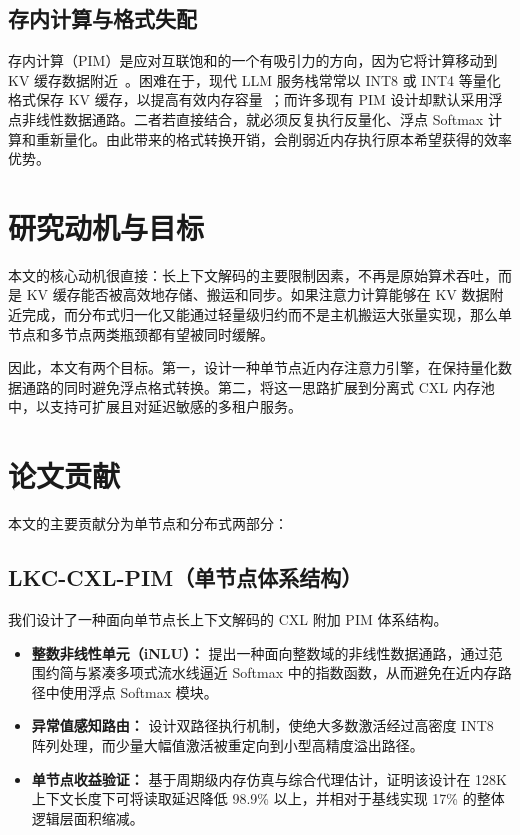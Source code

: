 \subsection{存内计算与格式失配}
存内计算（PIM）是应对互联饱和的一个有吸引力的方向，因为它将计算移动到 KV 缓存数据附近~\cite{samsung_pim}。困难在于，现代 LLM 服务栈常常以 INT8 或 INT4 等量化格式保存 KV 缓存，以提高有效内存容量~\cite{llm_outliers, gptq}；而许多现有 PIM 设计却默认采用浮点非线性数据通路。二者若直接结合，就必须反复执行反量化、浮点 Softmax 计算和重新量化。由此带来的格式转换开销，会削弱近内存执行原本希望获得的效率优势。

\section{研究动机与目标}
本文的核心动机很直接：长上下文解码的主要限制因素，不再是原始算术吞吐，而是 KV 缓存能否被高效地存储、搬运和同步。如果注意力计算能够在 KV 数据附近完成，而分布式归一化又能通过轻量级归约而不是主机搬运大张量实现，那么单节点和多节点两类瓶颈都有望被同时缓解。

因此，本文有两个目标。第一，设计一种单节点近内存注意力引擎，在保持量化数据通路的同时避免浮点格式转换。第二，将这一思路扩展到分离式 CXL 内存池中，以支持可扩展且对延迟敏感的多租户服务。

\section{论文贡献}
本文的主要贡献分为单节点和分布式两部分：

\subsection{LKC-CXL-PIM（单节点体系结构）}
我们设计了一种面向单节点长上下文解码的 CXL 附加 PIM 体系结构。
\begin{itemize}
    \item \textbf{整数非线性单元（iNLU）：} 提出一种面向整数域的非线性数据通路，通过范围约简与紧凑多项式流水线逼近 Softmax 中的指数函数，从而避免在近内存路径中使用浮点 Softmax 模块。
    \item \textbf{异常值感知路由：} 设计双路径执行机制，使绝大多数激活经过高密度 INT8 阵列处理，而少量大幅值激活被重定向到小型高精度溢出路径。
    \item \textbf{单节点收益验证：} 基于周期级内存仿真与综合代理估计，证明该设计在 128K 上下文长度下可将读取延迟降低 98.9\% 以上，并相对于基线实现 17\% 的整体逻辑层面积缩减。
\end{itemize}

